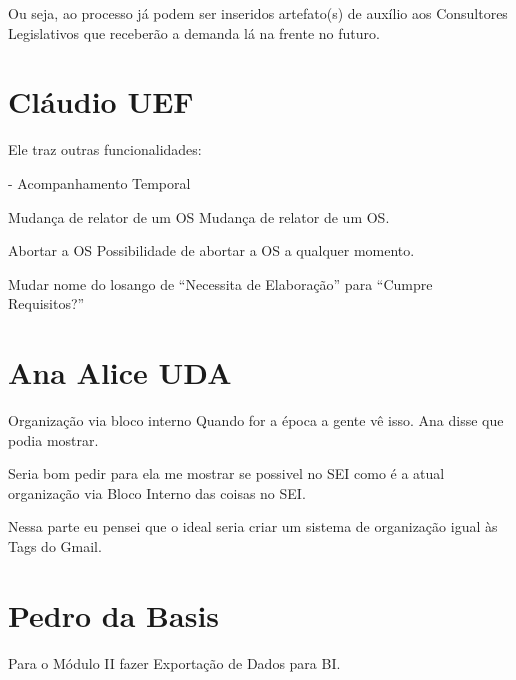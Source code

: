 Ou seja, ao processo já podem ser inseridos artefato(s) de auxílio aos Consultores Legislativos que receberão a demanda lá na frente no futuro.

   
\section{Cláudio UEF}





Ele traz outras funcionalidades:

- Acompanhamento Temporal


\begin{importante}{Mudança de relator de um OS}
	Mudança de relator de um OS.
\end{importante}


\begin{importante}{Abortar a OS}
	Possibilidade de abortar a OS a qualquer momento.	
\end{importante}

Mudar nome do losango de ``Necessita de Elaboração'' para ``Cumpre Requisitos?''


\section{Ana Alice UDA}


\begin{funcionalidade}{Organização via bloco interno}
	Quando for a época a gente vê isso. Ana disse que podia mostrar.
\end{funcionalidade}


Seria bom pedir para ela me mostrar se possivel no SEI como é a atual organização via Bloco Interno das coisas no SEI.

Nessa parte eu pensei que o ideal seria criar um sistema de organização igual às Tags do Gmail. 





\section{Pedro da Basis}

Para o Módulo II fazer Exportação de Dados para BI.
	
	




































